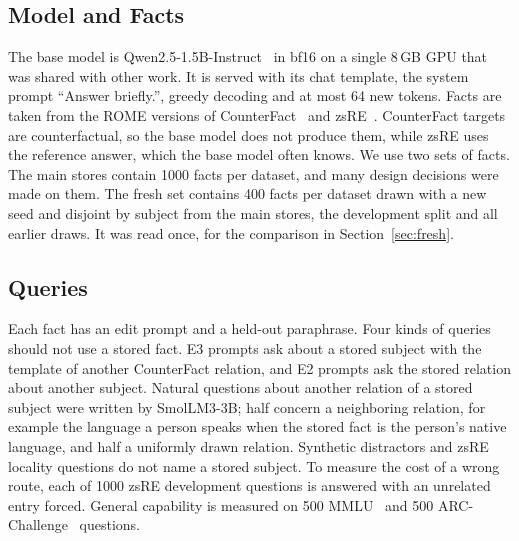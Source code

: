 \documentclass[journal,10pt]{IEEEtran}
\begin{document}
\subsection{Model and Facts}
The base model is Qwen2.5-1.5B-Instruct~\cite{qwen2024qwen25} in bf16 on a single 8\,GB GPU that was shared
with other work. It is served with its chat template, the system prompt ``Answer briefly.'', greedy decoding
and at most 64 new tokens. Facts are taken from the ROME versions of CounterFact~\cite{meng2022rome} and
zsRE~\cite{levy2017zeroshot,decao2021editing}. CounterFact targets are counterfactual, so the base model does
not produce them, while zsRE uses the reference answer, which the base model often knows. We use two sets of
facts. The main stores contain 1000 facts per dataset, and many design decisions were made on them. The fresh
set contains 400 facts per dataset drawn with a new seed and disjoint by subject from the main stores, the
development split and all earlier draws. It was read once, for the comparison in Section~\ref{sec:fresh}.

\subsection{Queries}
Each fact has an edit prompt and a held-out paraphrase. Four kinds of queries should not use a stored fact.
E3 prompts ask about a stored subject with the template of another CounterFact relation, and E2 prompts ask
the stored relation about another subject. Natural questions about another relation of a stored subject were
written by SmolLM3-3B; half concern a neighboring relation, for example the language a person speaks when the
stored fact is the person's native language, and half a uniformly drawn relation. Synthetic distractors and
zsRE locality questions do not name a stored subject. To measure the cost of a wrong route, each of 1000
zsRE development questions is answered with an unrelated entry forced. General capability is measured on 500
MMLU~\cite{hendrycks2021mmlu} and 500 ARC-Challenge~\cite{clark2018arc} questions.
\end{document}
